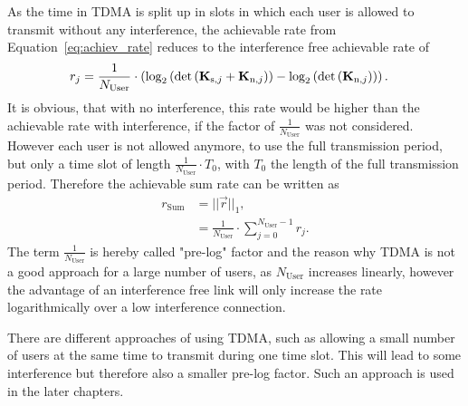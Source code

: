 As the time in TDMA is split up in slots in which each user is allowed to transmit without any interference, the achievable rate from Equation~\eqref{eq:achiev_rate} reduces to the interference free achievable rate of 
\begin{align}
\label{eq:tdma_achiev_rate}
r_j  &=\frac{1}{N_\text{User}}\cdot\left(
		\text{log}_2\left(\text{det}\left(\mathbf{K}_{\text{s},j}+\mathbf{K}_{\text{n},j}\right)\right) -
	     	\text{log}_2\left(\text{det}\left(\mathbf{K}_{\text{n},j}\right)\right)\right).
\end{align}
It is obvious, that with no interference, this rate would be higher than the achievable rate with interference, if the factor of $\frac{1}{N_\text{User}}$ was not considered.
However each user is not allowed anymore, to use the full transmission period, but only a time slot of length $\frac{1}{N_\text{User}}\cdot T_0$, with $T_0$ the length of the full transmission period.
Therefore the achievable sum rate can be written as
\begin{align}
\label{eq:tdma_achiev_sum_rate}
\nonumber
r_\text{Sum} &= ||\vec{r}||_1,\\
&= \frac{1}{N_\text{User}}\cdot \sum_{j=0}^{N_\text{User}-1} r_j.
\end{align}
The term $\frac{1}{N_\text{User}}$ is hereby called "pre-log" factor and the reason why TDMA is not a good approach for a large number of users, as $N_\text{User}$ increases linearly, however the advantage of an interference free link will only increase the rate logarithmically over a low interference connection.

There are different approaches of using TDMA, such as allowing a small number of users at the same time to transmit during one time slot.
This will lead to some interference but therefore also a smaller pre-log factor.
Such an approach is used in the later chapters.





